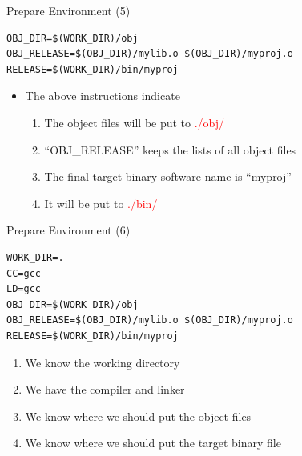 \begin{frame}[fragile]{Prepare Environment (5)}
\vspace{-0.2in}
\lstset{language=[gnu] make}
\begin{lstlisting}[linewidth=0.9\linewidth, xleftmargin=0.05\linewidth, caption=Makefile]
OBJ_DIR=$(WORK_DIR)/obj
OBJ_RELEASE=$(OBJ_DIR)/mylib.o $(OBJ_DIR)/myproj.o
RELEASE=$(WORK_DIR)/bin/myproj
\end{lstlisting}
\vspace{-0.1in}
\begin{itemize}
	\item {The above instructions indicate}
	\begin{enumerate}
		\item {The object files will be put to \textcolor{red}{./obj/}}
		\item {``OBJ\_RELEASE'' keeps the lists of all object files}
		\item {The final target binary software name is ``myproj''}
		\item {It will be put to \textcolor{red}{./bin/}}
	\end{enumerate}
\end{itemize}

\end{frame}


\begin{frame}[fragile]{Prepare Environment (6)}
\lstset{language=[gnu] make}
\begin{lstlisting}[linewidth=0.9\linewidth, xleftmargin=0.05\linewidth]
WORK_DIR=.
CC=gcc
LD=gcc
OBJ_DIR=$(WORK_DIR)/obj
OBJ_RELEASE=$(OBJ_DIR)/mylib.o $(OBJ_DIR)/myproj.o
RELEASE=$(WORK_DIR)/bin/myproj
\end{lstlisting}

\begin{enumerate}
	\item {We know the working directory }
	\item {We have the compiler and linker}
	\item {We know where we should put the object files}
	\item {We know where we should put the target binary file}
\end{enumerate}
\end{frame}

